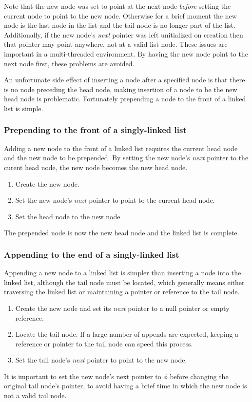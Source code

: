 \documentclass{article}
\begin{document}
  Note that the new node was set to point at the next node \emph{before} setting the current node to point to the new node. Otherwise for a brief moment the new node is the last node in the list and the tail node is no longer part of the list. Additionally, if the new node's \emph{next} pointer was left unitialized on creation then that pointer may point anywhere, not at a valid list node. These issues are important in a multi-threaded environment. By having the new node point to the next node first, these problems are avoided.

  An unfortunate side effect of inserting a node after a specified node is that there is no node preceding the head node, making insertion of a node to be the new head node is problematic. Fortunately prepending a node to the front of a linked list is simple.

  \subsubsection{Prepending to the front of a singly-linked list}
  Adding a new node to the front of a linked list requires the current head node and the new node to be prepended. By setting the new node's \emph{next} pointer to the curent head node, the new node becomes the new head node.
  \begin{enumerate}
    \item Create the new node.
    \item Set the new node's \emph{next} pointer to point to the current head node.
    \item Set the head node to the new node
  \end{enumerate}
  The prepended node is now the new head node and the linked list is complete.

  \subsubsection{Appending to the end of a singly-linked list}
  Appending a new node to a linked list is simpler than inserting a node into the linked list, although the tail node must be located, which generally means either traversing the linked list or maintaining a pointer or reference to the tail node.
  \begin{enumerate}
    \item Create the new node and set its \emph{next} pointer to a null pointer or empty reference.
    \item Locate the tail node. If a large number of appends are expected, keeping a reference or pointer to the tail node can speed this process.
    \item Set the tail node's \emph{next} pointer to point to the new node.
  \end{enumerate}
  It is important to set the new node's next pointer to $\phi$ before changing the original tail node's pointer, to avoid having a brief time in which the new node is not a valid tail node.
\end{document}
